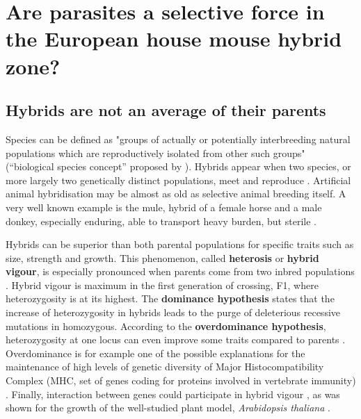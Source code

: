 \section{Are parasites a selective force in the European house mouse hybrid zone?}
\subsection{Hybrids are not an average of their parents}
Species can be defined as "groups of actually or potentially interbreeding natural populations which are reproductively isolated from other such groups" (“biological species concept” proposed by \cite{mayr_systematics_1942}). Hybrids appear when two species, or more largely two genetically distinct populations, meet and reproduce \citep{barton_analysis_1985}. Artificial animal hybridisation may be almost as old as selective animal breeding itself. A very well known example is the mule, hybrid of a female horse and a male donkey, especially enduring, able to transport heavy burden, but sterile \citep{leighton_mule_1967}. 
\par
Hybrids can be superior than both parental populations for specific traits such as size, strength and growth. This phenomenon, called \textbf{heterosis} or \textbf{hybrid vigour}, is especially pronounced when parents come from two inbred populations \citep{brenner_heterosis_2001}. Hybrid vigour is maximum in the first generation of crossing, F1, where heterozygosity is at its highest. The \textbf{dominance hypothesis} states that the increase of heterozygosity in hybrids leads to the purge of deleterious recessive mutations in homozygous. According to the \textbf{overdominance hypothesis}, heterozygosity at one locus can even improve some traits compared to parents \citep{crow_overdominance_2001}. Overdominance is for example one of the possible explanations for the maintenance of high levels of genetic diversity of Major Histocompatibility Complex (MHC, set of genes coding for proteins involved in vertebrate immunity) \citep{read_major_2001, sommer_importance_2005}. Finally, interaction between genes could participate in hybrid vigour \parencite[\textbf{positive epistasis};][]{schnell_multiplicative_1992}, as was shown for the growth of the well-studied plant model, \textit{Arabidopsis thaliana} \citep{vanhaeren_combining_2014}.
\par
